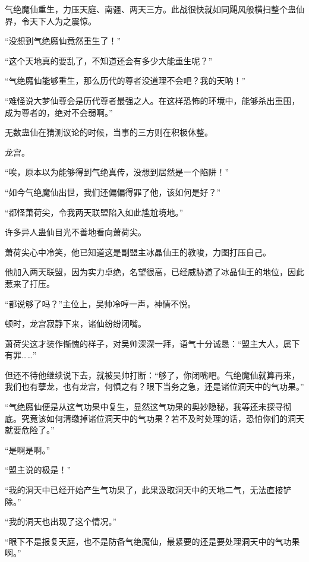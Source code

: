 
\begin{this_body}



气绝魔仙重生，力压天庭、南疆、两天三方。此战很快就如同飓风般横扫整个蛊仙界，令天下人为之震惊。

“没想到气绝魔仙竟然重生了！”

“这个天地真的要乱了，不知道还会有多少大能重生呢？”

“气绝魔仙能够重生，那么历代的尊者没道理不会吧？我的天呐！”

“难怪说大梦仙尊会是历代尊者最强之人。在这样恐怖的环境中，能够杀出重围，成为尊者的，绝对不会弱啊。”

无数蛊仙在猜测议论的时候，当事的三方则在积极休整。

龙宫。

“唉，原本以为能够得到气绝真传，没想到居然是一个陷阱！”

“如今气绝魔仙出世，我们还偏偏得罪了他，该如何是好？”

“都怪萧荷尖，令我两天联盟陷入如此尴尬境地。”

许多异人蛊仙目光不善地看向萧荷尖。

萧荷尖心中冷笑，他已知道这是副盟主冰晶仙王的教唆，力图打压自己。

他加入两天联盟，因为实力卓绝，名望很高，已经威胁道了冰晶仙王的地位，因此惹来了打压。

“都说够了吗？”主位上，吴帅冷哼一声，神情不悦。

顿时，龙宫寂静下来，诸仙纷纷闭嘴。

萧荷尖这才装作惭愧的样子，对吴帅深深一拜，语气十分诚恳：“盟主大人，属下有罪……”

但还不待他继续说下去，就被吴帅打断：“够了，你闭嘴吧。气绝魔仙就算再来，我们也有孽龙，也有龙宫，何惧之有？眼下当务之急，还是诸位洞天中的气功果。”

“气绝魔仙便是从这气功果中复生，显然这气功果的奥妙隐秘，我等还未探寻彻底。究竟该如何清缴掉诸位洞天中的气功果？若不及时处理的话，恐怕你们的洞天就要危险了。”

“是啊是啊。”

“盟主说的极是！”

“我的洞天中已经开始产生气功果了，此果汲取洞天中的天地二气，无法直接铲除。”

“我的洞天也出现了这个情况。”

“眼下不是报复天庭，也不是防备气绝魔仙，最紧要的还是要处理洞天中的气功果啊。”


\end{this_body}
